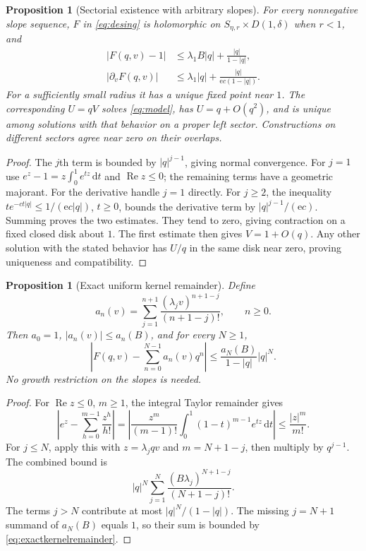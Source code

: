 \documentclass[11pt,a4paper]{article}
\numberwithin{equation}{section}
\newtheorem{proposition}[theorem]{Proposition}
\theoremstyle{definition}\newtheorem{definition}[theorem]{Definition}
\theoremstyle{remark}\newtheorem{remark}[theorem]{Remark}
\newcommand{\dd}{\,\mathrm d}\newcommand{\ee}{\mathrm e}
\DeclareMathOperator{\Rea}{Re}
\begin{document}
\begin{proposition}[Sectorial existence with arbitrary slopes]
\label{prop:existence}
For every nonnegative slope sequence, $F$ in \eqref{eq:desing} is
holomorphic on $S_{\eta,r}\times D(1,\delta)$ when $r<1$, and
\begin{align}
 |F(q,v)-1|&\le\lambda_1B|q|+\frac{|q|}{1-|q|},\label{eq:Fclose}\\
 |\partial_vF(q,v)|&\le\lambda_1|q|
                  +\frac{|q|}{\ee c(1-|q|)}.\label{eq:Fderivative}
\end{align}
For a sufficiently small radius it has a unique fixed point near $1$.
The corresponding $U=qV$ solves \eqref{eq:model}, has $U=q+O(q^2)$,
and is unique among solutions with that behavior on a proper left sector.
Constructions on different sectors agree near zero on their overlaps.
\end{proposition}
\begin{proof}
The $j$th term is bounded by $|q|^{j-1}$, giving normal convergence.
For $j=1$ use $e^z-1=z\int_0^1e^{tz}\dd t$ and
$\Rea z\le0$; the remaining terms have a geometric majorant.
For the derivative handle $j=1$ directly. For $j\ge2$, the inequality
$t e^{-ct|q|}\le1/(\ee c|q|)$, $t\ge0$, bounds the derivative term
by $|q|^{j-1}/(\ee c)$. Summing proves the two estimates.
They tend to zero, giving contraction on a fixed closed disk about $1$.
The first estimate then gives $V=1+O(q)$. Any other solution with the
stated behavior has $U/q$ in the same disk near zero, proving uniqueness
and compatibility.
\end{proof}

\begin{proposition}[Exact uniform kernel remainder]
\label{prop:kernelremainder}
Define
\begin{equation}
 a_n(v)=\sum_{j=1}^{n+1}
        \frac{(\lambda_jv)^{n+1-j}}{(n+1-j)!},\qquad n\ge0.
 \label{eq:an}
\end{equation}
Then $a_0=1$, $|a_n(v)|\le a_n(B)$, and for every $N\ge1$,
\begin{equation}
 \boxed{\quad
 \left|F(q,v)-\sum_{n=0}^{N-1}a_n(v)q^n\right|
 \le\frac{a_N(B)}{1-|q|}|q|^N.
 \quad}
 \label{eq:exactkernelremainder}
\end{equation}
No growth restriction on the slopes is needed.
\end{proposition}
\begin{proof}
For $\Rea z\le0$, $m\ge1$, the integral Taylor remainder gives
\begin{equation}
 \left|e^z-\sum_{h=0}^{m-1}\frac{z^h}{h!}\right|
 =\left|\frac{z^m}{(m-1)!}
       \int_0^1(1-t)^{m-1}e^{tz}\dd t\right|
 \le\frac{|z|^m}{m!}.
 \label{eq:exptail}
\end{equation}
For $j\le N$, apply this with $z=\lambda_jqv$ and $m=N+1-j$,
then multiply by $q^{j-1}$. The combined bound is
\[
 |q|^N\sum_{j=1}^N\frac{(B\lambda_j)^{N+1-j}}{(N+1-j)!}.
\]
The terms $j>N$ contribute at most $|q|^N/(1-|q|)$.
The missing $j=N+1$ summand of $a_N(B)$ equals $1$, so their sum is
bounded by \eqref{eq:exactkernelremainder}.
\end{proof}
\end{document}
